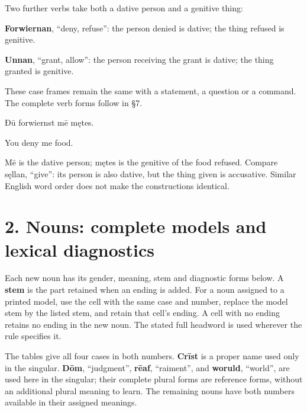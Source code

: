 Two further verbs take both a dative person and a genitive thing:

\textbf{Forwiernan}, “deny, refuse”: the person denied is dative; the thing refused is genitive.

\textbf{Unnan}, “grant, allow”: the person receiving the grant is dative; the thing granted is genitive.

These case frames remain the same with a statement, a question or a command. The complete verb forms follow in §7.

Ðū forwiernst mē mętes.

You deny me food.

Mē is the dative person; mętes is the genitive of the food refused. Compare sęllan, “give”: its person is also dative, but the thing given is accusative. Similar English word order does not make the constructions identical.

\section*{2. Nouns: complete models and lexical diagnostics}

Each new noun has its gender, meaning, stem and diagnostic forms below. A \textbf{stem} is the part retained when an ending is added. For a noun assigned to a printed model, use the cell with the same case and number, replace the model stem by the listed stem, and retain that cell's ending. A cell with no ending retains no ending in the new noun. The stated full headword is used wherever the rule specifies it.

The tables give all four cases in both numbers. \textbf{Crīst} is a proper name used only in the singular. \textbf{Dōm}, “judgment”, \textbf{rēaf}, “raiment”, and \textbf{woruld}, “world”, are used here in the singular; their complete plural forms are reference forms, without an additional plural meaning to learn. The remaining nouns have both numbers available in their assigned meanings.


